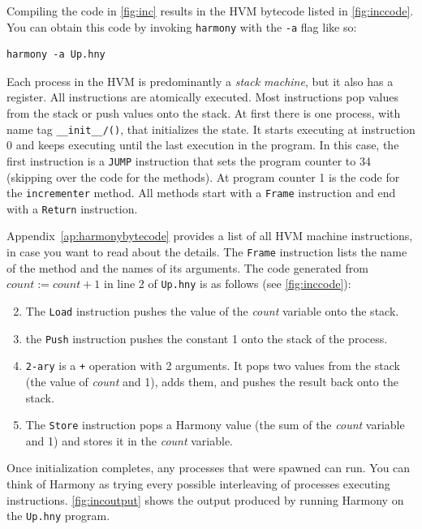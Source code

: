 \documentclass{report}
\newenvironment{code}{
\tcolorbox
}{
\endtcolorbox
}
\begin{document}
%

Compiling the code in \autoref{fig:inc} results in the HVM bytecode
listed in \autoref{fig:inccode}.
You can obtain this code by invoking \texttt{harmony} with the \texttt{-a} flag
like so:
\begin{code}
\begin{verbatim}
harmony -a Up.hny
\end{verbatim}
\end{code}
Each process in the HVM is predominantly a \emph{stack machine},
%
but it also has a register.
All instructions are atomically executed.
Most instructions pop values from the stack or push values onto the stack.
At first there is one process, with name tag \texttt{\_\_init\_\_/()},
that initializes the state.
It starts executing at instruction 0 and keeps executing until the last
execution in the program.
In this case, the first instruction is a \texttt{JUMP} instruction that sets the
program counter to 34 (skipping over the code for the methods).
At program counter 1 is the code for the \texttt{incrementer} method.
All methods start with a \texttt{Frame} instruction and end with a \texttt{Return}
instruction.

Appendix~\ref{ap:harmonybytecode} provides a list of all HVM machine instructions,
in case you want to read about the details.
The \texttt{Frame} instruction lists the name of the method and the
names of its arguments.
The code generated from $\mathit{count} := \mathit{count} + 1$ in line 2 of
\texttt{Up.hny} is as follows (see \autoref{fig:inccode}):

\begin{enumerate} \setcounter{enumi}{1}
\item The \texttt{Load} instruction pushes the value of the
\textit{count} variable onto the stack.
\item the \texttt{Push} instruction pushes the constant 1
onto the stack of the process.
\item \texttt{2-ary} is a \texttt{+} operation with 2 arguments.
It pops two values from the stack (the value of \textit{count} and 1),
adds them, and pushes the result back onto the stack.
\item The \texttt{Store} instruction pops
a Harmony value (the sum of the \textit{count} variable and 1) and
stores it in the \textit{count} variable.
\end{enumerate}

Once initialization completes, any processes that were spawned can run.
You can think of Harmony as trying every possible interleaving of processes executing
instructions.
\autoref{fig:incoutput} shows the output produced by running Harmony on the
\texttt{Up.hny} program.
\end{document}
